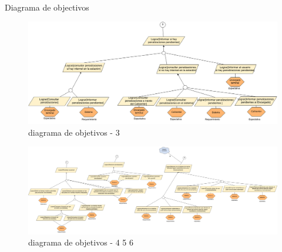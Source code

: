 \begin{subsection}{Diagrama de objectivos}
\begin{figure}[H]
        \centering
        \includegraphics[angle=90,width=\textwidth,height=\textheight,keepaspectratio]{imagenes/do_3.png}
        \caption{diagrama de objetivos - 3}
        \label{fig:diagrama_objetivos_3}
\end{figure}

\begin{figure}[H]
        \centering
        \includegraphics[angle=90,width=\textwidth,height=\textheight,keepaspectratio]{imagenes/do_4-5-6.png}
        \caption{diagrama de objetivos - 4 5 6}
        \label{fig:diagrama_objetivos_4_5_6}
\end{figure}
%	
%

\end{subsection}


